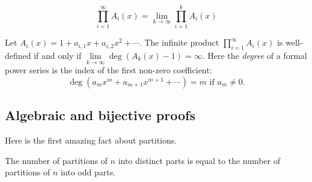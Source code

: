 \begin{page}

\begin{dfn}
\[
\prod_{i=1}^\infty A_i(x) = \lim_{k \to \infty} \prod_{i=1}^k A_i(x)
\]
\end{dfn}

\end{page}

\begin{page}

\begin{lem}
Let $A_i(x) = 1 + a_{i,1} x + a_{i,2} x^2 + \cdots$.
The infinite product $\prod_{i=1}^\infty A_i(x)$ is well-defined if and only if $\lim\limits_{k \to \infty} \deg (A_k(x) - 1) = \infty$.
Here the \emph{degree} of a formal power series is the index of the first non-zero coefficient:
\[
\deg (a_m x^m + a_{m+1} x^{m+1} + \cdots) = m \text{ if } a_m \ne 0.
\]
\end{lem}

\end{page}

\begin{page}

\subsection{Algebraic and bijective proofs}


Here is the first amazing fact about partitions.


\end{page}

\begin{page}

\begin{thm}
The number of partitions of $n$ into distinct parts is equal to the number of partitions of $n$ into odd parts.
\end{thm}

\end{page}

